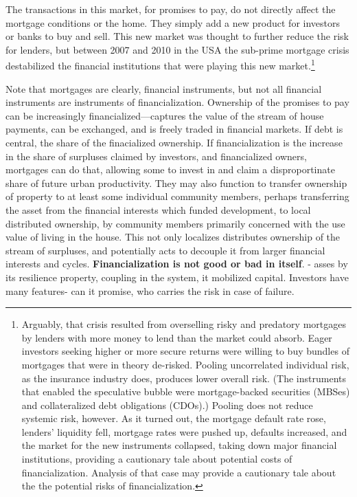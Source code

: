 The transactions in this market, for promises to pay, do not directly affect the mortgage conditions or the home. They simply add a new product for investors or banks to buy and sell. This new market was thought to further reduce the risk for lenders, but between 2007 and 2010 in the USA the sub-prime mortgage crisis destabilized the financial institutions that were playing this new market.\footnote{Arguably, that crisis resulted from overselling risky and predatory mortgages by lenders with more money to lend than the market could absorb. Eager investors seeking higher or more secure returns were willing  to buy bundles of  mortgages that were in theory de-risked. Pooling uncorrelated individual risk, as the insurance industry does, produces lower overall risk. (The instruments that enabled the speculative bubble were mortgage-backed securities (MBSes) and collateralized debt obligations (CDOs).) Pooling does not reduce systemic risk, however. As it turned out, the mortgage default rate rose, lenders' liquidity fell, mortgage rates were pushed up, defaults increased, and the market for the new instruments collapsed, taking down major financial institutions, providing a cautionary tale about potential costs of financialization. Analysis of that case may provide a cautionary tale about the the potential risks of financialization.} 

Note that mortgages are clearly, financial instruments, but not all financial instruments are instruments of financialization. Ownership of the promises to pay can be increasingly financialized---captures the value of the stream of house payments, can be exchanged, and is freely traded in financial markets. If debt is central, the share of the finacialized ownership.
If financialization is the increase in the share of surpluses claimed by investors, and financialized owners, mortgages can do that, allowing some to invest in and claim a disproportinate share of future urban productivity. They may also function to transfer ownership of property to at least some individual community members, perhaps transferring the asset from the financial interests which funded development, to local distributed ownership, by community members primarily concerned with the use value of living in the house. This not only localizes distributes ownership of the stream of surpluses, and potentially acts to decouple it from larger financial interests and cycles. 
\textbf{Financialization is not good or bad in itself}. - asses by its resilience property, coupling in the system, it mobilized capital. Investors have many features- can it promise, who carries the risk in case of failure. 


